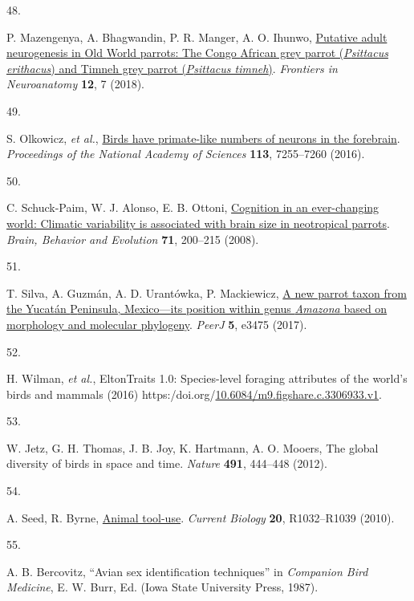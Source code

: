 \documentclass[
  man, donotrepeattitle,floatsintext]{apa6}
\newlength{\cslhangindent}
\newlength{\csllabelwidth}
\newlength{\cslentryspacingunit} %
\newenvironment{CSLReferences}[2] %
 {%
  \setlength{\parindent}{0pt}
  \ifodd #1
  \let\oldpar\par
  \def\par{\hangindent=\cslhangindent\oldpar}
  \fi
  \setlength{\parskip}{#2\cslentryspacingunit}
 }%
 {}
\newcommand{\CSLLeftMargin}[1]{\parbox[t]{\csllabelwidth}{#1}}
\newcommand{\CSLRightInline}[1]{\parbox[t]{\linewidth - \csllabelwidth}{#1}\break}
\begin{document}
\begin{CSLReferences}{0}{0}
\leavevmode{}%
\CSLLeftMargin{48. }%
\CSLRightInline{P. Mazengenya, A. Bhagwandin, P. R. Manger, A. O. Ihunwo, \href{https://doi.org/10.3389/fnana.2018.00007}{Putative adult neurogenesis in {O}ld {W}orld parrots: The {C}ongo {A}frican grey parrot (\emph{{P}sittacus erithacus}) and {T}imneh grey parrot (\emph{{P}sittacus timneh})}. \emph{Frontiers in Neuroanatomy} \textbf{12}, 7 (2018).}

\leavevmode{}%
\CSLLeftMargin{49. }%
\CSLRightInline{S. Olkowicz, \emph{et al.}, \href{https://doi.org/10.1073/pnas.1517131113}{Birds have primate-like numbers of neurons in the forebrain}. \emph{Proceedings of the National Academy of Sciences} \textbf{113}, 7255--7260 (2016).}

\leavevmode{}%
\CSLLeftMargin{50. }%
\CSLRightInline{C. Schuck-Paim, W. J. Alonso, E. B. Ottoni, \href{https://doi.org/10.1159/000119710}{Cognition in an ever-changing world: Climatic variability is associated with brain size in neotropical parrots}. \emph{Brain, Behavior and Evolution} \textbf{71}, 200--215 (2008).}

\leavevmode{}%
\CSLLeftMargin{51. }%
\CSLRightInline{T. Silva, A. Guzmán, A. D. Urantówka, P. Mackiewicz, \href{https://doi.org/10.7717/peerj.3475}{A new parrot taxon from the {Y}ucat{á}n {P}eninsula, {M}exico---its position within genus \emph{{A}mazona} based on morphology and molecular phylogeny}. \emph{PeerJ} \textbf{5}, e3475 (2017).}

\leavevmode{}%
\CSLLeftMargin{52. }%
\CSLRightInline{H. Wilman, \emph{et al.}, EltonTraits 1.0: Species-level foraging attributes of the world's birds and mammals (2016) https:/doi.org/\href{https://doi.org/10.6084/m9.figshare.c.3306933.v1}{10.6084/m9.figshare.c.3306933.v1}.}

\leavevmode{}%
\CSLLeftMargin{53. }%
\CSLRightInline{W. Jetz, G. H. Thomas, J. B. Joy, K. Hartmann, A. O. Mooers, The global diversity of birds in space and time. \emph{Nature} \textbf{491}, 444--448 (2012).}

\leavevmode{}%
\CSLLeftMargin{54. }%
\CSLRightInline{A. Seed, R. Byrne, \href{https://doi.org/10.1016/j.cub.2010.09.042}{Animal tool-use}. \emph{Current Biology} \textbf{20}, R1032--R1039 (2010).}

\leavevmode{}%
\CSLLeftMargin{55. }%
\CSLRightInline{A. B. Bercovitz, {``Avian sex identification techniques''} in \emph{Companion Bird Medicine}, E. W. Burr, Ed. (Iowa State University Press, 1987).}


\end{CSLReferences}
\end{document}
